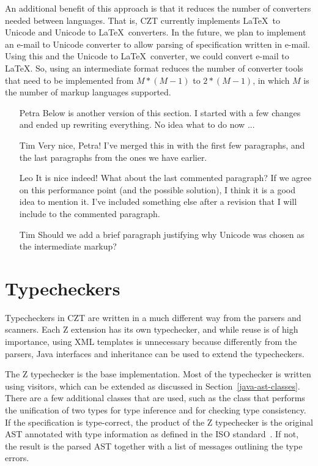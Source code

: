 \documentclass{llncs}
\begin{document}
An additional benefit of this approach is that it reduces the number
of converters needed between languages. That is, CZT currently
implements \LaTeX\ to Unicode and Unicode to \LaTeX\ converters. In
the future, we plan to implement an e-mail to Unicode converter to
allow parsing of specification written in e-mail. Using this and the
Unicode to \LaTeX\ converter, we could convert e-mail to \LaTeX. So,
using an intermediate format reduces the number of converter tools
that need to be implemented from $M*(M-1)$ to $2*(M-1)$, in which $M$
is the number of markup languages supported.

  \begin{itemize}
    \item[Petra] Below is another version of this section.  I started
    with a few changes and ended up rewriting everything.  No idea
    what to do now ...
    \item[Tim] Very nice, Petra! I've merged this in with the first
    few paragraphs, and the last paragraphs from the ones we have
    earlier.
    \item[Leo] It is nice indeed!
    What about the last commented paragraph?
    If we agree on this performance point (and the possible solution),
    I think it is a good idea to mention it. I've included something else
    after a revision that I will include to the commented paragraph.
    \item[Tim] Should we add a brief paragraph justifying why Unicode
    was chosen as the intermediate markup?
  \end{itemize}

\section{Typecheckers}
\label{typecheckers}

Typecheckers in CZT are written in a much different way from the parsers
and scanners. Each Z extension has its own typechecker, and while reuse
is of high importance, using XML templates is unnecessary because
differently from the parsers, Java interfaces and inheritance can be used to
extend the typecheckers.

The Z typechecker is the base implementation. Most of the typechecker
is written using visitors, which can be extended as discussed in
Section~\ref{java-ast-classes}. There are a few additional classes
that are used, such as the class that performs the unification of two
types for type inference and for checking type consistency. If the
specification is type-correct, the product of the Z typechecker is the
original AST annotated with type information as defined in the ISO
standard~\cite[Section~10]{isoz}.  If not, the result is the parsed AST
together with a list of messages outlining the type errors.
\end{document}
